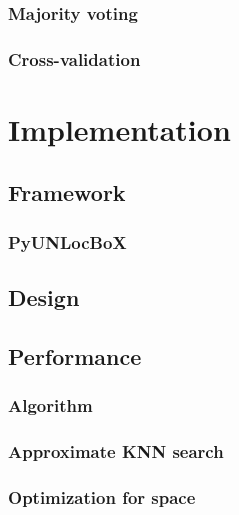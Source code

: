 \subsection{Majority voting}

\subsection{Cross-validation}




\chapter{Implementation} \label{chap:implementation}

\section{Framework}

\subsection{PyUNLocBoX}

\section{Design}

\section{Performance}

\subsection{Algorithm}

\subsection{Approximate KNN search}

\subsection{Optimization for space}

